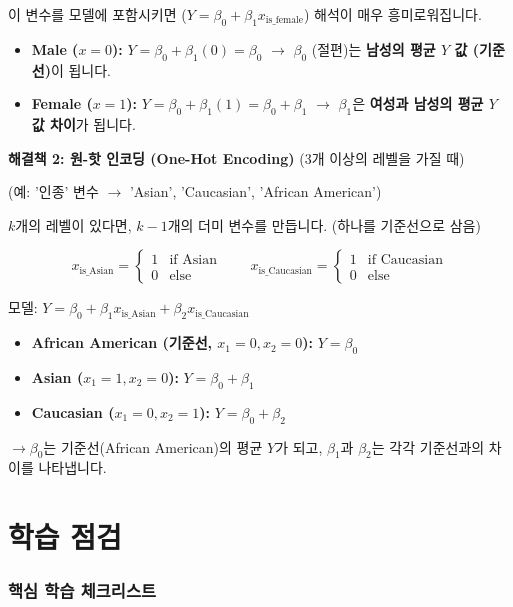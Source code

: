\documentclass[11pt,a4paper]{book}
\theoremstyle{definition}
\begin{document}
이 변수를 모델에 포함시키면 ($Y = \beta_0 + \beta_1 x_{\text{is\_female}}$) 해석이 매우 흥미로워집니다.

\begin{itemize}
    \item \textbf{Male ($x=0$):} $Y = \beta_0 + \beta_1(0) = \beta_0$
    $\rightarrow$ $\beta_0$ (절편)는 \textbf{남성의 평균 $Y$ 값 (기준선)}이 됩니다.
    \item \textbf{Female ($x=1$):} $Y = \beta_0 + \beta_1(1) = \beta_0 + \beta_1$
    $\rightarrow$ $\beta_1$은 \textbf{여성과 남성의 평균 $Y$ 값 차이}가 됩니다.
\end{itemize}

\textbf{해결책 2: 원-핫 인코딩 (One-Hot Encoding)} (3개 이상의 레벨을 가질 때)

(예: '인종' 변수 $\rightarrow$ 'Asian', 'Caucasian', 'African American')

$k$개의 레벨이 있다면, $k-1$개의 더미 변수를 만듭니다. (하나를 기준선으로 삼음)

$$ x_{\text{is\_Asian}} = \begin{cases} 1 & \text{if Asian} \\ 0 & \text{else} \end{cases} \quad \quad x_{\text{is\_Caucasian}} = \begin{cases} 1 & \text{if Caucasian} \\ 0 & \text{else} \end{cases} $$

모델: $Y = \beta_0 + \beta_1 x_{\text{is\_Asian}} + \beta_2 x_{\text{is\_Caucasian}}$

\begin{itemize}
    \item \textbf{African American (기준선, $x_1=0, x_2=0$):} $Y = \beta_0$
    \item \textbf{Asian ($x_1=1, x_2=0$):} $Y = \beta_0 + \beta_1$
    \item \textbf{Caucasian ($x_1=0, x_2=1$):} $Y = \beta_0 + \beta_2$
\end{itemize}
$\rightarrow \beta_0$는 기준선(African American)의 평균 $Y$가 되고, $\beta_1$과 $\beta_2$는 각각 기준선과의 차이를 나타냅니다.

\part{학습 점검}

\section{핵심 학습 체크리스트}
\end{document}
